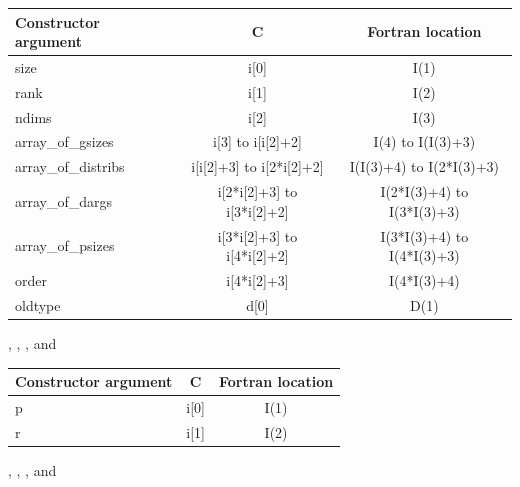 \begin{description}[style=unboxed,leftmargin=0cm]
\begin{center}
\begin{tabular}{l c c}
\hline
Constructor argument &          C &                    Fortran location                \\
\hline
size &                          i[0] &                          I(1)                            \\
rank &                          i[1] &                          I(2)                            \\
ndims &                         i[2] &                          I(3)                            \\
array\_of\_gsizes &             i[3] to i[i[2]+2] &             I(4) to I(I(3)+3)               \\
array\_of\_distribs &           i[i[2]+3] to i[2*i[2]+2] &      I(I(3)+4) to I(2*I(3)+3)        \\
array\_of\_dargs &              i[2*i[2]+3] to i[3*i[2]+2] &    I(2*I(3)+4) to I(3*I(3)+3)      \\
array\_of\_psizes &             i[3*i[2]+3] to i[4*i[2]+2] &    I(3*I(3)+4) to I(4*I(3)+3)      \\
order &                         i[4*i[2]+3] &                   I(4*I(3)+4)                     \\
oldtype &                       d[0] &                          D(1)                            \\
\hline
\end{tabular}
\end{center}

\item[\mpiconstmain{MPI\_COMBINER\_F90\_REAL}]
, , , and

\begin{center}
\begin{tabular}{l c c}
\hline
Constructor argument &          C &                    Fortran location                \\
\hline
p &                             i[0] &                          I(1)                            \\
r &                             i[1] &                          I(2)                            \\
\hline
\end{tabular}
\end{center}

\item[\mpiconstmain{MPI\_COMBINER\_F90\_COMPLEX}]
, , , and


\end{description}
